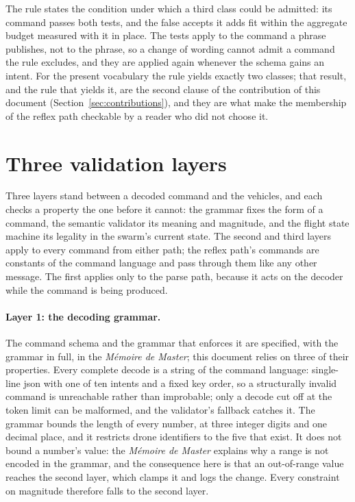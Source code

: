 \enlargethispage{\baselineskip}%
The rule states the condition under which a third class could be admitted: its command passes
both tests, and the false accepts it adds fit within the aggregate budget measured with it in
place. The tests apply to the command a phrase publishes, not to the phrase, so a change of
wording cannot admit a command the rule excludes, and they are applied again whenever the schema
gains an intent. For the present vocabulary the rule yields exactly two classes; that result, and the rule that
yields it, are the second clause of the contribution of this document
(Section~\ref{sec:contributions}), and they are what make the membership of the reflex path
checkable by a reader who did not choose it.

\section{Three validation layers}
\label{sec:validation-layers}
Three layers stand between a decoded command and the vehicles, and each checks a property the one
before it cannot: the grammar fixes the form of a command, the semantic validator its meaning and
magnitude, and the flight state machine its legality in the swarm's current state. The second and
third layers apply to every command from either path; the reflex path's commands are constants of
the command language and pass through them like any other message. The first applies only to the
parse path, because it acts on the decoder while the command is being produced.

\paragraph{Layer 1: the decoding grammar.} The command schema and the grammar that enforces it are
specified, with the grammar in full, in the \emph{M\'emoire de Master}; this document relies on
three of their properties. Every complete decode is a string of the command language: single-line
\gls{json} with one of ten intents and a fixed key order, so a structurally invalid command is
unreachable rather than improbable; only a decode cut off at the token limit can be malformed, and
the validator's fallback catches it. The grammar bounds the length of every number, at three
integer digits and one decimal place, and it restricts drone identifiers to the five that exist.
It does not bound a number's value: the \emph{M\'emoire de Master} explains why a range is not
encoded in the grammar, and the consequence here is that an out-of-range value reaches the second
layer, which clamps it and logs the change. Every constraint on magnitude therefore falls to the second layer.

